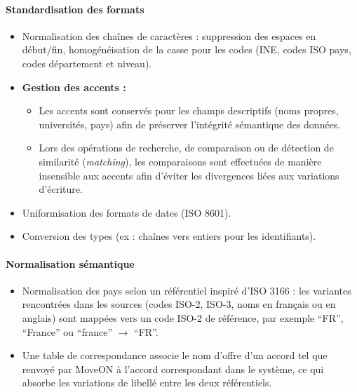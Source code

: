 \paragraph{Standardisation des formats}
\begin{itemize}
    \item Normalisation des chaînes de caractères : suppression des espaces en début/fin, homogénéisation de la casse pour les codes (INE, codes ISO pays, codes département et niveau).
    
    \item \textbf{Gestion des accents :}
    \begin{itemize}
        \item Les accents sont conservés pour les champs descriptifs (noms propres, universités, pays) afin de préserver l’intégrité sémantique des données.
        
        \item Lors des opérations de recherche, de comparaison ou de détection de similarité (\textit{matching}), les comparaisons sont effectuées de manière insensible aux accents afin d’éviter les divergences liées aux variations d’écriture.
    \end{itemize}
    
    \item Uniformisation des formats de dates (ISO 8601).
    
    \item Conversion des types (ex : chaînes vers entiers pour les identifiants).
\end{itemize}

\paragraph{Normalisation sémantique}
\begin{itemize}
    \item Normalisation des pays selon un référentiel inspiré d'ISO 3166 : les variantes rencontrées dans les sources (codes ISO-2, ISO-3, noms en français ou en anglais) sont mappées vers un code ISO-2 de référence, par exemple “FR”, “France” ou “france” $\rightarrow$ “FR”.

    \item Une table de correspondance associe le nom d'offre d'un accord tel que renvoyé par MoveON à l'accord correspondant dans le système, ce qui absorbe les variations de libellé entre les deux référentiels.
\end{itemize}

